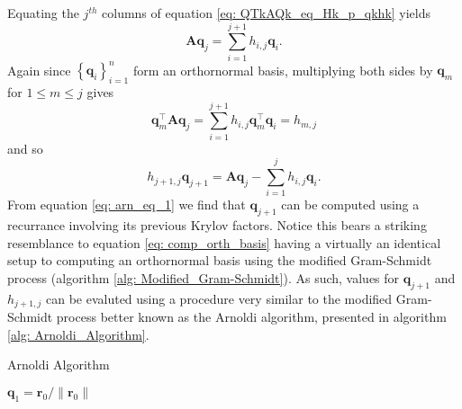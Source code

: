 Equating the $j^{th}$ columns of equation \ref{eq: QTkAQk_eq_Hk_p_qkhk} yields
\[
    \bm{A} \bm{q}_j = \sum_{i=1}^{j+1} h_{i,j} \bm{q}_{i}.
\]
Again since $\left\{ \bm{q}_i \right\}_{i=1}^{n}$ form an orthornormal basis, multiplying both sides by $\bm{q}_m$ for $1 \leq m \leq j$ gives
\[
    \bm{q}_m^{\intercal} \bm{A} \bm{q}_j = \sum_{i=1}^{j+1} h_{i,j} \bm{q}_m^{\intercal} \bm{q}_{i} = h_{m,j}
\]
and so
\begin{equation}\label{eq: arn_eq_1}
    h_{j+1,j} \bm{q}_{j+1} = \bm{A} \bm{q}_j - \sum_{i=1}^{j} h_{i,j} \bm{q}_{i}.
\end{equation}
From equation \ref{eq: arn_eq_1} we find that $\bm{q}_{j+1}$ can be computed using a recurrance involving its previous Krylov factors. Notice this bears a striking resemblance to equation \ref{eq: comp_orth_basis} having a virtually an identical setup to computing an orthornormal basis using the modified Gram-Schmidt process (algorithm \ref{alg: Modified_Gram-Schmidt}). As such, values for $\bm{q}_{j+1}$ and $h_{j+1,j}$ can be evaluted using a procedure very similar to the modified Gram-Schmidt process better known as the Arnoldi algorithm, presented in algorithm \ref{alg: Arnoldi_Algorithm}.

{\centering
\begin{minipage}{.85\linewidth}
    \begin{algorithm}[H]
        \caption{Arnoldi Algorithm}
        \label{alg: Arnoldi_Algorithm}
        \SetAlgoLined
        \DontPrintSemicolon

        \BlankLine
        $\bm{q}_1 = \bm{r}_0 / \| \bm{r}_0 \|$\;
        \BlankLine
    \end{algorithm}
\end{minipage}
\par
}

